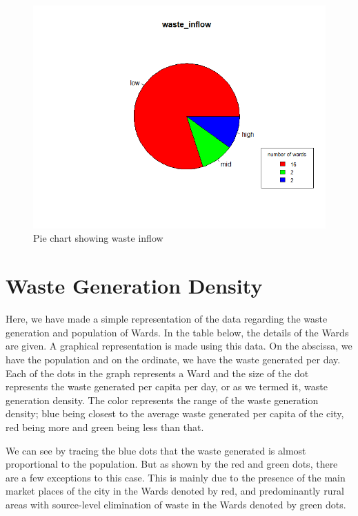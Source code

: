 \documentclass[12pt,a4paper]{  report}
\begin{document}
\begin{figure}
	\centering
	\includegraphics[width=1\linewidth]{waste_inflow}
	\caption{Pie chart showing waste inflow}
	\label{fig:wasteinflow}
\end{figure}


\section{Waste Generation Density}
Here, we have made a simple representation of the data regarding the waste generation and population of Wards. In the table below, the details of the Wards are given. A graphical representation is made using this data. On the abscissa, we have the population and on the ordinate, we have the waste generated per day. Each of the dots in the graph represents a Ward and the size of the dot represents the waste generated per capita per day, or as we termed it, waste generation density. The color represents the range of the waste generation density; blue being closest to the average waste generated per capita of the city, red being more and green being less than that.


We can see by tracing the blue dots that the waste generated is almost proportional to the population. But as shown by the red and green dots, there are a few exceptions to this case. This is mainly due to the presence of the main market places of the city in the Wards denoted by red, and predominantly rural areas with source-level elimination of waste in the Wards denoted by green dots.
\end{document}
